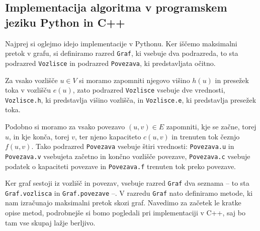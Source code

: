 \documentclass[mat1]{fmfdelo}
\begin{document}

\subsection{Implementacija algoritma v programskem jeziku Python in C++}

Najprej si oglejmo idejo implementacije v Pythonu. Ker iščemo maksimalni pretok v grafu, si definiramo razred \texttt{Graf}, ki vsebuje dva podrazreda, to sta podrazred \texttt{Vozlisce} in podrazred \texttt{Povezava}, ki predstavljata očitno.

Za vsako vozlišče $u \in V$ si moramo zapomniti njegovo višino $h(u)$ in presežek toka v vozlišču $e(u)$, zato podrazred \texttt{Vozlisce} vsebuje dve vrednosti, \texttt{Vozlisce.h}, ki predstavlja višino vozlišča, in \texttt{Vozlisce.e}, ki predstavlja presežek toka.

Podobno si moramo za vsako povezavo $(u,v) \in E$ zapomniti, kje se začne, torej $u$, in kje konča, torej $v$, ter njeno kapaciteto $c(u,v)$ in trenuten tok čeznjo $f(u,v)$. Tako podrazred \texttt{Povezava} vsebuje štiri vrednosti: \texttt{Povezava.u} in \texttt{Povezava.v} vsebujeta začetno in končno vozlišče povezave, \texttt{Povezava.c} vsebuje podatek o kapaciteti povezave in \texttt{Povezava.f} trenuten tok preko povezave.

Ker graf sestoji iz vozlišč in povezav, vsebuje razred \texttt{Graf} dva seznama -- to sta \texttt{Graf.vozlisca} in \texttt{Graf.povezave} --. V razredu \texttt{Graf} nato definiramo metode, ki nam izračunajo maksimalni pretok skozi graf. Navedimo za začetek le kratke opise metod, podrobnejše si bomo pogledali pri implementaciji v C++, saj bo tam vse skupaj lažje berljivo.
\end{document}
